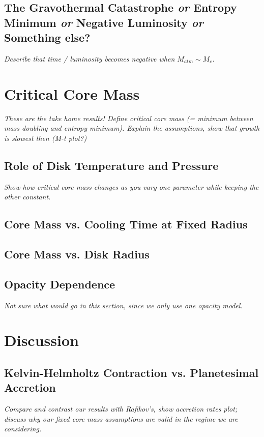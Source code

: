 \documentclass[apj]{emulateapj}
\newcommand{\emgr}[1]{\emph{ \color{gray} #1}}
\begin{document}
\subsection{The Gravothermal Catastrophe \emgr{or} {Entropy Minimum} \emgr{or} {Negative Luminosity} \emgr{or} Something else?}
\emgr{Describe that time / luminosity becomes negative when $M_{atm} \sim M_c$.}

\section{Critical Core Mass}
\emgr{These are the take home results! Define critical core mass (= minimum between mass doubling and entropy minimum). Explain the assumptions, show that growth is slowest then (M-t plot?)}

\subsection{Role of Disk Temperature and Pressure}
\emgr{Show how critical core mass changes as you vary one parameter while keeping the other constant.}

\subsection{Core Mass vs. Cooling Time at Fixed Radius}

\subsection{Core Mass vs. Disk Radius}

\subsection{Opacity Dependence}
\emgr{Not sure what would go in this section, since we only use one opacity model.}


\section{Discussion}
\subsection{Kelvin-Helmholtz Contraction vs. Planetesimal Accretion}
\emgr{Compare and contrast our results with Rafikov's, show accretion rates plot; discuss why our fixed core mass assumptions are valid in the regime we are considering.}
\end{document}
